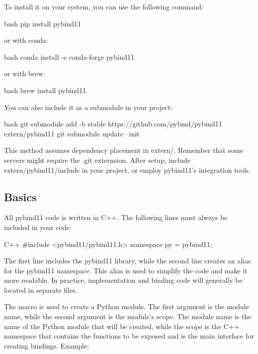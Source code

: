 To install it on your system, you can use the following command:

\begin{neonlisting}{bash}
    pip install pybind11
\end{neonlisting}

or with conda:

\begin{neonlisting}{bash}
    conda install -c conda-forge pybind11
\end{neonlisting}

or with brew:

\begin{neonlisting}{bash}
    brew install pybind11
\end{neonlisting}

You can also include it as a submodule in your project:

\begin{neonlisting}{bash}
    git submodule add -b stable https://github.com/pybind/pybind11 extern/pybind11
    git submodule update --init 
\end{neonlisting}

This method assumes dependency placement in extern/. Remember that some servers might require the .git externsion.
After setup, include extern/pybind11/include in your project, or employ pybind11's integration tools.

\subsection{Basics}

All pybind11 code is written in C++. The following lines must always be included in your code:

\begin{neonlisting}[language=C++]{C++}
    #include <pybind11/pybind11.h>
    namespace py = pybind11;
\end{neonlisting}

The first line includes the pybind11 library, while the second line creates an alias for the pybind11 namespace. This alias is used to simplify the code and make it more readable.
In practice, implementation and binding code will generally be located in separate files.

The  macro is used to create a Python module. The first argument is the module name, while the second argument is the module's scope. The module name is the name of the Python module that will be created, while the scope is the C++ namespace that contains the functions to be exposed and is the main interface for creating bindings.
Example:


